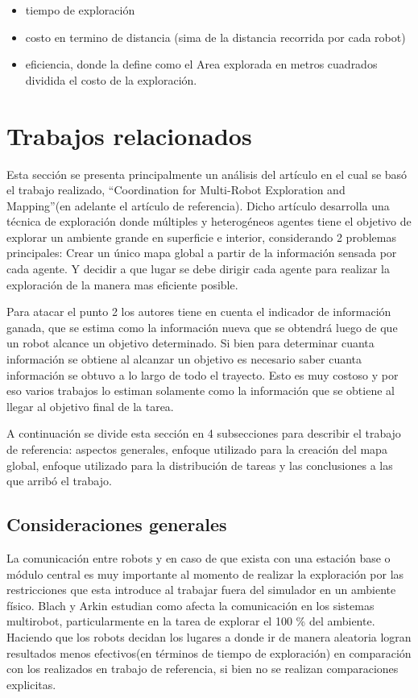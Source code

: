 \documentclass[runningheads]{llncs}
\begin{document}
\begin{itemize}
	\item tiempo de exploración
	\item costo en termino de distancia (sima de la distancia recorrida por cada robot)
	\item eficiencia, donde la define como el Area explorada en metros cuadrados dividida el costo de la exploración.
\end{itemize}


\section{Trabajos relacionados}

Esta sección se presenta principalmente un análisis del artículo en el cual se basó el trabajo realizado, “Coordination for Multi-Robot Exploration and Mapping”(en adelante el artículo de referencia). Dicho artículo desarrolla una técnica de exploración donde múltiples y heterogéneos agentes tiene el objetivo de explorar un ambiente grande en superficie e interior, considerando 2 problemas principales:
Crear un único mapa global a partir de la información sensada por cada agente.
Y decidir a que lugar se debe dirigir cada agente para realizar la exploración de la manera mas eficiente posible.

Para atacar el punto 2 los autores tiene en cuenta el indicador de información ganada, que se  estima como la información nueva que se obtendrá luego de que un robot alcance un objetivo determinado. Si bien para determinar cuanta información se obtiene al alcanzar un objetivo es necesario saber cuanta información se obtuvo a lo largo de todo el trayecto. Esto es muy costoso \cite{utility} y por eso varios trabajos \cite{Visser, Zlot, Gonzalez} lo estiman solamente como la información que se obtiene al llegar al objetivo final de la tarea.

A continuación se divide esta sección en 4 subsecciones para describir el trabajo de referencia: aspectos generales, enfoque utilizado para la creación del mapa global, enfoque utilizado para la distribución de tareas y las conclusiones a las que arribó el trabajo.

\subsection{Consideraciones generales}

La comunicación entre robots y en caso de que exista con una estación base o módulo central es muy importante al momento de realizar la exploración por las restricciones que esta introduce al trabajar fuera del simulador en un ambiente físico. Blach y Arkin \cite{Blach} estudian como afecta la comunicación en los sistemas multirobot, particularmente en la tarea de explorar el 100 \% del ambiente. Haciendo que los robots decidan los lugares a donde ir de manera aleatoria logran resultados menos efectivos(en términos de tiempo de exploración) en comparación con los realizados en trabajo de referencia, si bien no se realizan comparaciones explicitas. 
\end{document}
